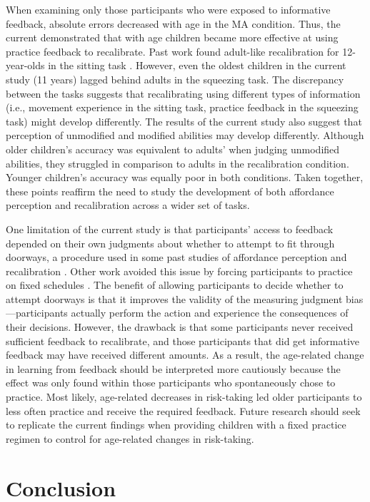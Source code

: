 \documentclass[a4paper,man,natbib,floatsintext,noextraspace]{apa6}
\begin{document}
When examining only those participants who were exposed to informative feedback, absolute errors decreased with age in the MA condition. Thus, the current demonstrated that with age children became more effective at using practice feedback to recalibrate. Past work found adult-like recalibration for 12-year-olds in the sitting task \citep{ChenRecal}. However, even the oldest children in the current study (11 years) lagged behind adults in the squeezing task. The discrepancy between the tasks suggests that recalibrating using different types of information (i.e., movement experience in the sitting task, practice feedback in the squeezing task) might develop differently. The results of the current study also suggest that perception of unmodified and modified abilities may develop differently. Although older children's accuracy was equivalent to adults' when judging unmodified abilities, they struggled in comparison to adults in the recalibration condition. Younger children's accuracy was equally poor in both conditions. Taken together, these points reaffirm the need to study the development of both affordance perception and recalibration across a wider set of tasks. 

One limitation of the current study is that participants' access to feedback depended on their own judgments about whether to attempt to fit through doorways, a procedure used in some past studies of affordance perception and recalibration \citep{PregAps, ChildReaching}. Other work avoided this issue by forcing participants to practice on fixed schedules \citep{DoorwayLearning, Recal,Yasuda}. The benefit of allowing participants to decide whether to attempt doorways is that it improves the validity of the measuring judgment bias---participants actually perform the action and experience the consequences of their decisions. However, the drawback is that some participants never received sufficient feedback to recalibrate, and those participants that did get informative feedback may have received different amounts. As a result, the age-related change in learning from feedback should be interpreted more cautiously because the effect was only found within those participants who spontaneously chose to practice. Most likely, age-related decreases in risk-taking led older participants to less often practice and receive the required feedback. Future research should seek to replicate the current findings when providing children with a fixed practice regimen to control for age-related changes in risk-taking.

\section{Conclusion}
\end{document}

